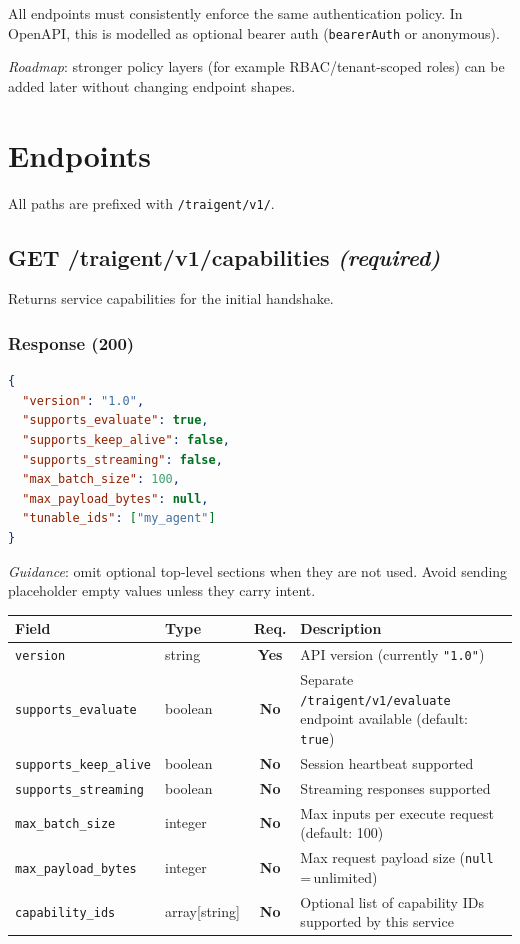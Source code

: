 \documentclass[11pt,a4paper]{article}
\newcommand{\field}[1]{\texttt{#1}}
\newcommand{\required}{\textbf{Yes}}
\newcommand{\optional}{\textbf{No}}
\newcommand{\status}[1]{\texttt{"#1"}}
\begin{document}
All endpoints must consistently enforce the same authentication policy.
In OpenAPI, this is modelled as optional bearer auth (\texttt{bearerAuth} or anonymous).

\textit{Roadmap}: stronger policy layers (for example RBAC/tenant-scoped roles)
can be added later without changing endpoint shapes.

\section{Endpoints}\label{sec:endpoints}

All paths are prefixed with \texttt{/traigent/v1/}.

\subsection{GET /traigent/v1/capabilities \normalfont\textit{(required)}}

Returns service capabilities for the initial handshake.

\subsubsection{Response (200)}

\begin{lstlisting}[language=json]
{
  "version": "1.0",
  "supports_evaluate": true,
  "supports_keep_alive": false,
  "supports_streaming": false,
  "max_batch_size": 100,
  "max_payload_bytes": null,
  "tunable_ids": ["my_agent"]
}
\end{lstlisting}

\textit{Guidance}: omit optional top-level sections when they are not used.
Avoid sending placeholder empty values unless they carry intent.

\begin{center}\small
\begin{tabularx}{\textwidth}{@{}llcX@{}}
\toprule
\textbf{Field} & \textbf{Type} & \textbf{Req.} & \textbf{Description} \\
\midrule
\field{version}              & string  & \required & API version (currently \status{1.0}) \\
\field{supports\_evaluate}   & boolean & \optional & Separate \texttt{/traigent/v1/evaluate} endpoint available (default: \texttt{true}) \\
\field{supports\_keep\_alive}& boolean & \optional & Session heartbeat supported \\
\field{supports\_streaming}  & boolean & \optional & Streaming responses supported \\
\field{max\_batch\_size}     & integer & \optional & Max inputs per execute request (default: 100) \\
\field{max\_payload\_bytes}  & integer & \optional & Max request payload size (\texttt{null}\,=\,unlimited) \\
\field{capability\_ids}      & array[string] & \optional & Optional list of capability IDs supported by this service \\
\bottomrule
\end{tabularx}
\end{center}
\end{document}
